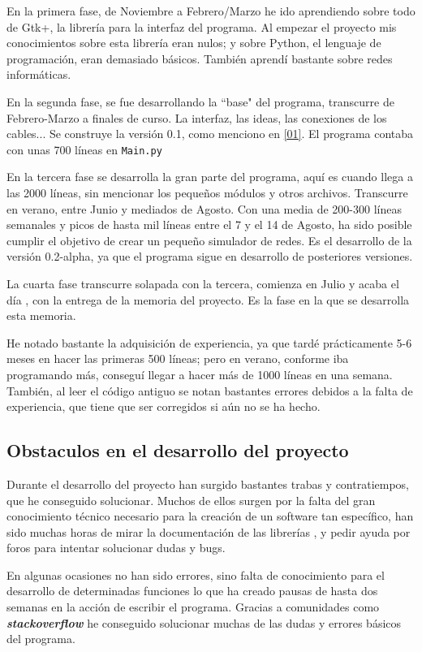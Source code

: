 \documentclass[a4paper, 11pt]{report} %
\begin{document}
En la primera fase, de Noviembre a Febrero/Marzo he ido aprendiendo sobre todo de Gtk+, la librería para la interfaz del programa. Al empezar el proyecto mis conocimientos sobre esta librería eran nulos; y sobre Python, el lenguaje de programación, eran demasiado básicos. También aprendí bastante sobre redes informáticas.

En la segunda fase, se fue desarrollando la ``base" del programa, transcurre de Febrero-Marzo a finales de curso. La interfaz, las ideas, las conexiones de los cables... Se construye la versión 0.1, como menciono en \ref{01}. El programa contaba con unas 700 líneas en \texttt{Main.py}

En la tercera fase se desarrolla la gran parte del programa, aquí es cuando llega a las 2000 líneas, sin mencionar los pequeños módulos y otros archivos. Transcurre en verano, entre Junio y mediados de Agosto. Con una media de 200-300 líneas semanales y picos de hasta mil líneas entre el 7 y el 14 de Agosto, ha sido posible cumplir el objetivo de crear un pequeño simulador de redes. Es el desarrollo de la versión 0.2-alpha, ya que el programa sigue en desarrollo de posteriores versiones.

La cuarta fase transcurre solapada con la tercera, comienza en Julio y acaba el día \@date, con la entrega de la memoria del proyecto. Es la fase en la que se desarrolla esta memoria.

He notado bastante la adquisición de experiencia, ya que tardé prácticamente 5-6 meses en hacer las primeras 500 líneas; pero en verano, conforme iba programando más, conseguí llegar a hacer más de 1000 líneas en una semana. También, al leer el código antiguo se notan bastantes errores debidos a la falta de experiencia, que tiene que ser corregidos si aún no se ha hecho.

\subsection{Obstaculos en el desarrollo del proyecto}
Durante el desarrollo del proyecto han surgido bastantes trabas y contratiempos, que he conseguido solucionar. Muchos de ellos surgen por la falta del gran conocimiento técnico necesario para la creación de un software tan específico, han sido muchas horas de mirar la documentación de las librerías \cite{PyGiApi}, y pedir ayuda por foros para intentar solucionar dudas y bugs.

En algunas ocasiones no han sido errores, sino falta de conocimiento para el desarrollo de determinadas funciones lo que ha creado pausas de hasta dos semanas en la acción de escribir el programa. Gracias a comunidades como \textbf{\textit{stackoverflow}} he conseguido solucionar muchas de las dudas y errores básicos del programa.
\end{document}
